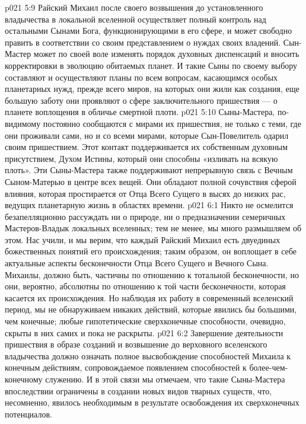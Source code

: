 \vs p021 5:9 Райский Михаил после своего возвышения до установленного владычества в локальной вселенной осуществляет полный контроль над остальными Сынами Бога, функционирующими в его сфере, и может свободно править в соответствии со своим представлением о нуждах своих владений. Сын\hyp{}Мастер может по своей воле изменять порядок духовных диспенсаций и вносить корректировки в эволюцию обитаемых планет. И такие Сыны по своему выбору составляют и осуществляют планы по всем вопросам, касающимся особых планетарных нужд, прежде всего миров, на которых они жили как создания, еще большую заботу они проявляют о сфере заключительного пришествия --- о планете воплощения в обличье смертной плоти.
\vs p021 5:10 Сыны\hyp{}Мастера, по\hyp{}видимому постоянно сообщаются с мирами их пришествия, не только с теми, где они проживали сами, но и со всеми мирами, которые Сын\hyp{}Повелитель одарил своим пришествием. Этот контакт поддерживается их собственным духовным присутствием, Духом Истины, который они способны «изливать на всякую плоть». Эти Сыны\hyp{}Мастера также поддерживают непрерывную связь с Вечным Сыном\hyp{}Матерью в центре всех вещей. Они обладают полной сочувствия сферой влияния, которая простирается от Отца Всего Сущего в высях до низких рас, ведущих планетарную жизнь в областях времени.
\vs p021 6:1 Никто не осмелится безапелляционно рассуждать ни о природе, ни о предназначении семеричных Мастеров\hyp{}Владык локальных вселенных; тем не менее, мы много размышляем об этом. Нас учили, и мы верим, что каждый Райский Михаил есть  двуединых божественных понятий его происхождения; таким образом, он воплощает в себе актуальные аспекты бесконечности Отца Всего Сущего и Вечного Сына. Михаилы, должно быть, частичны по отношению к тотальной бесконечности, но они, вероятно, абсолютны по отношению к той части бесконечности, которая касается их происхождения. Но наблюдая их работу в современный вселенский период, мы не обнаруживаем никаких действий, которые явились бы большими, чем конечные; любые гипотетические сверхконечные способности, очевидно, скрыты в них самих и пока не раскрыты.
\vs p021 6:2 Завершение деятельности пришествия в образе созданий и возвышение до верховного вселенского владычества должно означать полное высвобождение способностей Михаила к конечным действиям, сопровождаемое появлением способностей к более\hyp{}чем\hyp{}конечному служению. И в этой связи мы отмечаем, что такие Сыны\hyp{}Мастера впоследствии ограничены в создании новых видов тварных существ, что, несомненно, явилось необходимым в результате освобождения их сверхконечных потенциалов.

